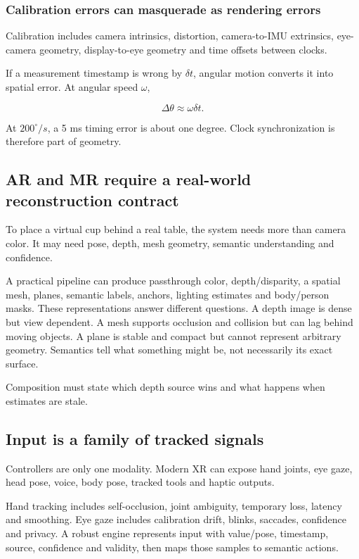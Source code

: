 \subsubsection{Calibration errors can masquerade as rendering errors}\label{calibration-errors-can-masquerade-as-rendering-errors}

Calibration includes camera intrinsics, distortion, camera-to-IMU extrinsics, eye-camera geometry, display-to-eye geometry and time offsets between clocks.

If a measurement timestamp is wrong by \(\delta t\), angular motion converts it into spatial error. At angular speed \(\omega\),

\[
\Delta\theta\approx \omega\delta t.
\]

At \(200^\circ/s\), a 5 ms timing error is about one degree. Clock synchronization is therefore part of geometry.

\subsection{AR and MR require a real-world reconstruction contract}\label{ar-and-mr-require-a-real-world-reconstruction-contract}

To place a virtual cup behind a real table, the system needs more than camera color. It may need pose, depth, mesh geometry, semantic understanding and confidence.

A practical pipeline can produce passthrough color, depth/disparity, a spatial mesh, planes, semantic labels, anchors, lighting estimates and body/person masks. These representations answer different questions. A depth image is dense but view dependent. A mesh supports occlusion and collision but can lag behind moving objects. A plane is stable and compact but cannot represent arbitrary geometry. Semantics tell what something might be, not necessarily its exact surface.

Composition must state which depth source wins and what happens when estimates are stale.

\subsection{Input is a family of tracked signals}\label{input-is-a-family-of-tracked-signals}

Controllers are only one modality. Modern XR can expose hand joints, eye gaze, head pose, voice, body pose, tracked tools and haptic outputs.

Hand tracking includes self-occlusion, joint ambiguity, temporary loss, latency and smoothing. Eye gaze includes calibration drift, blinks, saccades, confidence and privacy. A robust engine represents input with value/pose, timestamp, source, confidence and validity, then maps those samples to semantic actions.

